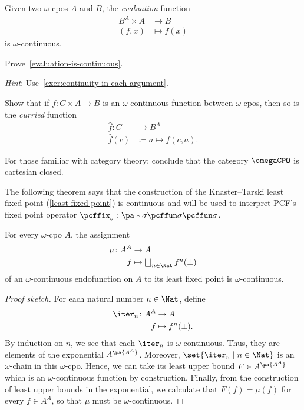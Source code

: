 \begin{lemma}\label{evaluation-is-continuous}
  Given two \(\omega\)-cpos \(A\) and \(B\), the \emph{evaluation} function
  \begin{align*}
    B^A \times A &\to B \\
    (f,x) &\mapsto f(x)
  \end{align*}
  is \(\omega\)-continuous.
\end{lemma}
\begin{exercise}\label{exer:evaluation-is-continuous}
  Prove~\cref{evaluation-is-continuous}.

  \emph{Hint}: Use~\cref{exer:continuity-in-each-argument}.
\end{exercise}

\begin{exercise}\label{exer:curry-is-continuous}
  Show that if \(f \colon C \times A \to B\) is an \(\omega\)-continuous
  function between \(\omega\)-cpos, then so is the \emph{curried} function
  \begin{align*}
    \hat{f} \colon C &\to B^A \\
    \hat{f}(c) &\coloneqq a \mapsto f(c,a).
  \end{align*}

  For those familiar with category theory: conclude that the category
  \(\omegaCPO\) is cartesian closed.
\end{exercise}

The following theorem says that the construction of the Knaster--Tarski least
fixed point (\cref{least-fixed-point}) is continuous and will be used to
interpret PCF's fixed point operator
\(\pcffix_\sigma : \pa*{\sigma \pcffun \sigma} \pcffun \sigma\).
\begin{theorem}\label{least-fixed-point-is-continuous}
  For every \(\omega\)-cpo \(A\), the assignment
  \begin{align*}
    \mu \colon A^A &\to A \\
    f &\mapsto \textstyle\bigsqcup_{n \in \Nat}f^n(\bot)
  \end{align*}
  of an \(\omega\)-continuous endofunction on \(A\) to its least fixed point is
  \(\omega\)-continuous.
\end{theorem}
\begin{proof}[Proof sketch]
  For each natural number \(n \in \Nat\), define
  \begin{align*}
    \iter_n \colon A^A &\to A \\
    f &\mapsto f^n(\bot).
  \end{align*}
  By induction on \(n\), we see that each \(\iter_n\) is \(\omega\)-continuous.
  Thus, they are elements of the exponential \(A^{\pa{A^A}}\).
  Moreover, \(\set{\iter_n \mid n \in \Nat}\) is an \(\omega\)-chain in this
  \(\omega\)-cpo.
  Hence, we can take its least upper bound \(F \in A^{\pa{A^A}}\) which is an
  \(\omega\)-continuous function by construction.
  Finally, from the construction of least upper bounds in the exponential, we
  calculate that \(F(f) = \mu(f)\) for every \(f \in A^A\), so that \(\mu\)
  must be \(\omega\)-continuous.
\end{proof}

